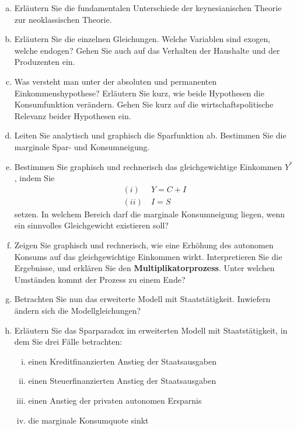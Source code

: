 \documentclass{scrartcl}
\begin{document}
\begin{enumerate}[(a)]
  \item Erläutern Sie die fundamentalen Unterschiede der keynesianischen Theorie zur neoklassischen Theorie.
  \item Erl\"{a}utern Sie die einzelnen Gleichungen. Welche Variablen sind
      exogen, welche endogen? Gehen Sie auch auf das Verhalten der
      Haushalte und der Produzenten ein.
 \item Was versteht man unter der absoluten und permanenten Einkommenshypothese? Erläutern Sie kurz, wie beide Hypothesen die Konsumfunktion verändern. Gehen Sie kurz auf die wirtschaftspolitische Relevanz beider Hypothesen ein.
  \item Leiten Sie analytisch und graphisch die Sparfunktion ab.
      Bestimmen Sie die marginale Spar- und Konsumneigung.
  \item Bestimmen Sie graphisch und rechnerisch das gleichgewichtige
      Einkommen $Y^*$, indem Sie
      \begin{align*}
      (i)&~ Y=C+I\\
      (ii)&~ I=S
      \end{align*}
      setzen. In welchem Bereich darf die marginale Konsumneigung liegen, wenn ein sinnvolles Gleichgewicht existieren soll?
  \item Zeigen Sie graphisch und rechnerisch, wie eine Erh\"{o}hung des autonomen Konsums
  auf das gleichgewichtige Einkommen wirkt. Interpretieren Sie die
  Ergebnisse, und erkl\"{a}ren Sie den \textbf{Multiplikatorprozess}. Unter
  welchen Umst\"{a}nden kommt der Prozess zu einem Ende?
  \item Betrachten Sie nun das erweiterte Modell mit Staatst\"{a}tigkeit. Inwiefern \"{a}ndern sich die Modellgleichungen?
  \item Erl\"{a}utern Sie das Sparparadox im erweiterten Modell mit Staatst\"{a}tigkeit, in dem Sie drei F\"{a}lle betrachten:
  \begin{enumerate}[(i)]
  \item einen Kreditfinanzierten Anstieg der Staatsausgaben
  \item einen Steuerfinanzierten Anstieg der Staatsausgaben
  \item einen Anstieg der privaten autonomen Ersparnis
  \item die marginale Konsumquote sinkt
  \end{enumerate}
\end{enumerate}
\end{document}
